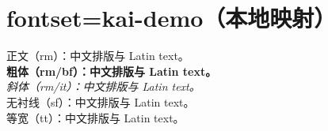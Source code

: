 \documentclass[fontset = kai-demo, 12pt]{ctexart}
\begin{document}
\section*{fontset=kai-demo（本地映射）}

\noindent\rmfamily
正文（rm）：中文排版与 Latin text。\\[.7em]
\textbf{粗体（rm/bf）：中文排版与 Latin text。}\\[.7em]
\textit{斜体（rm/it）：中文排版与 Latin text。}\\[.7em]
\sffamily 无衬线（sf）：中文排版与 Latin text。\\[.7em]
\ttfamily 等宽（tt）：中文排版与 Latin text。
\end{document}
